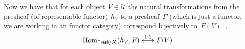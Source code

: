 \documentclass[a4paper,11pt,oneside,openany,article]{memoir}
\begin{document}
\begin{enumerate}
\begin{solution}
      Now we have that for each object~$V\in\mathcal{U}$ the natural transformations from the presheaf (of representable functor)~$h_V$ to a presheaf~$F$ (which is just a functor, we are working in an functor category) correspond bijectively to~$F(V)$. \Ie,
      \begin{equation}
        \operatorname{Hom}_{\mathsf{Presh}/X}(h_V,F)\overset{1:1}{\longleftrightarrow}F(V)
      \end{equation}
    \end{solution}






\end{enumerate}
\end{document}
